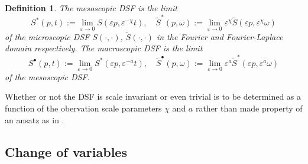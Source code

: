 \documentclass[12pt]{article}
\newtheorem{definition}[theorem]{Definition}
\begin{document}
\begin{definition}
\label{Def:mesomacroscale}
The mesoscopic DSF is the limit 
\begin{equation}
S^\ast(p,t) := \lim_{\varepsilon \to 0} 
S(\varepsilon p, \varepsilon^{-\chi} t), \quad
\tilde{S}^\ast(p,\omega) := \lim_{\varepsilon \to 0} \varepsilon^{\chi} 
\tilde{S}(\varepsilon p, \varepsilon^{\chi} \omega)
\label{Smesodef}
\end{equation}
of the microscopic DSF $S(\cdot, \cdot)$, $\tilde{S}(\cdot, \cdot)$ 
in the Fourier and Fourier-Laplace domain respectively.
The macroscopic DSF is the limit 
\begin{equation}
S^{\bullet}(p,t) := \lim_{\varepsilon \to 0} 
S^\ast(\varepsilon p, \varepsilon^{-a} t), \quad
\tilde{S}^{\bullet}(p,\omega) := \lim_{\varepsilon \to 0} \varepsilon^{a} 
\tilde{S}^\ast(\varepsilon p, \varepsilon^{a} \omega)
\label{Smacrodef}
\end{equation}
of the mesoscopic DSF.
\end{definition}
Whether or not the DSF is scale invariant or even trivial is to be determined as a function of the obervation scale parameters $\chi$ 
and $a$ rather than made property of an ansatz as in  \cite{Spoh14,Popk15a,Popk15b}.


\subsection{Change of variables}
\end{document}
